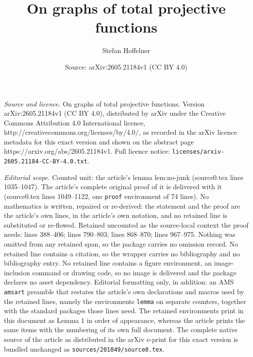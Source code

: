 \documentclass[10pt,a4paper]{amsart}
\title{On graphs of total projective functions}
\author{Stefan Hoffelner}
\date{Source: arXiv:2605.21184v1 (CC BY 4.0)}
\begin{document}
\maketitle

\noindent\emph{Source and licence.} On graphs of total projective functions. Version arXiv:2605.21184v1 (CC BY 4.0), distributed by arXiv under the Creative Commons Attribution 4.0 International licence, http://creativecommons.org/licenses/by/4.0/, as recorded in the arXiv licence metadata for this exact version and shown on the abstract page https://arxiv.org/abs/2605.21184v1. Full licence notice: \texttt{licenses/arxiv-2605.21184-CC-BY-4.0.txt}.\par\smallskip

\noindent\textit{Editorial scope.} Counted unit: the article's lemma lem:no-junk (source0.tex lines 1035--1047). The article's complete original proof of it is delivered with it (source0.tex lines 1049--1122, one \texttt{proof} environment of 74 lines). No mathematics is written, repaired or re-derived: the statement and the proof are the article's own lines, in the article's own notation, and no retained line is substituted or re-flowed.  Retained uncounted as the source-local context the proof needs: lines 388--406; lines 790--803; lines 868--870; lines 967--975.  Nothing was omitted from any retained span, so the package carries no omission record.  No retained line contains a citation, so the wrapper carries no bibliography and no bibliography entry.  No retained line contains a figure environment, an image-inclusion command or drawing code, so no image is delivered and the package declares no asset dependency.  Editorial formatting only, in addition: an AMS \texttt{amsart} preamble that restates the article's own declarations and macros used by the retained lines, namely the environments \texttt{lemma} on separate counters, together with the standard packages those lines need.  The retained environments print in this document as Lemma 1 in order of appearance, whereas the article prints the same items with the numbering of its own full document.  The complete native source of the article as distributed in the arXiv e-print for this exact version is bundled unchanged as \texttt{sources/201049/source0.tex}.
\end{document}
